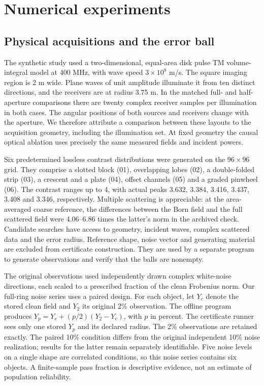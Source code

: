 \documentclass[anonymous,12pt]{iopjournal}
\theoremstyle{remark}\newtheorem{remark}[theorem]{Remark}
\numberwithin{equation}{section}
\begin{document}
\section{Numerical experiments}\label{sec:exp}

\subsection{Physical acquisitions and the error ball}
The synthetic study used a two-dimensional, equal-area disk pulse TM volume-integral model at 400 MHz, with wave speed $3\times10^8$ m/s. The square imaging region is 2 m wide. Plane waves of unit amplitude illuminate it from ten distinct directions, and the receivers are at radius 3.75 m. In the matched full- and half-aperture comparisons there are twenty complex receiver samples per illumination in both cases. The angular positions of both sources and receivers change with the aperture. We therefore attribute a comparison between these layouts to the acquisition geometry, including the illumination set. At fixed geometry the causal optical ablation uses precisely the same measured fields and incident powers.

Six predetermined lossless contrast distributions were generated on the $96\times96$ grid. They comprise a slotted block (01), overlapping lobes (02), a double-folded strip (03), a crescent and a plate (04), offset channels (05) and a graded pinwheel (06). The contrast ranges up to 4, with actual peaks 3.632, 3.384, 3.416, 3.437, 3.408 and 3.346, respectively. Multiple scattering is appreciable: at the area-averaged coarse reference, the differences between the Born field and the full scattered field were 4.06--6.86 times the latter's norm in the archived check. Candidate searches have access to geometry, incident waves, complex scattered data and the error radius. Reference shape, noise vector and generating material are excluded from certificate construction. They are used by a separate program to generate observations and verify that the balls are nonempty.

The original observations used independently drawn complex white-noise directions, each scaled to a prescribed fraction of the clean Frobenius norm. Our full-ring noise series uses a paired design. For each object, let $Y_c$ denote the stored clean field and $Y_2$ its original 2\% observation. The offline program produces $Y_p=Y_c+(p/2)(Y_2-Y_c)$, with $p$ in percent. The certificate runner sees only one stored $Y_p$ and its declared radius. The 2\% observations are retained exactly. The paired 10\% condition differs from the original independent 10\% noise realization; results for the latter remain separately identifiable. Five noise levels on a single shape are correlated conditions, so this noise series contains six objects. A finite-sample pass fraction is descriptive evidence, not an estimate of population reliability.
\end{document}
